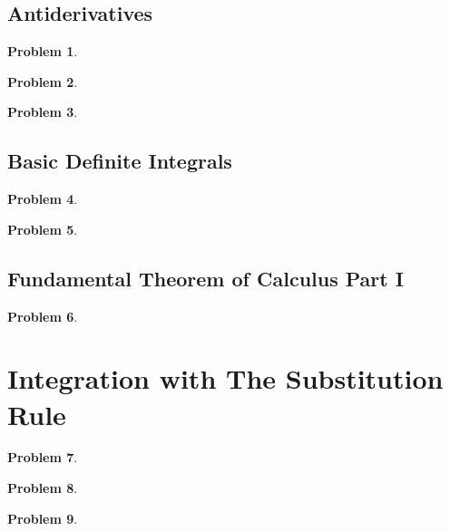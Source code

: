 \documentclass{article}
\newtheorem{problem}{Problem}
\begin{document}
\subsection{Antiderivatives}
\begin{problem}

\end{problem}
\begin{problem}

\end{problem}
\begin{problem}

\end{problem}

\subsection{Basic Definite Integrals}
\begin{problem}

\end{problem}

\begin{problem}

\end{problem}
\subsection{Fundamental Theorem of Calculus Part I}
\begin{problem}

\end{problem}

\section{Integration with The Substitution Rule}
\begin{problem}

\end{problem}

\begin{problem}

\end{problem}

\begin{problem}

\end{problem}

\end{document}
